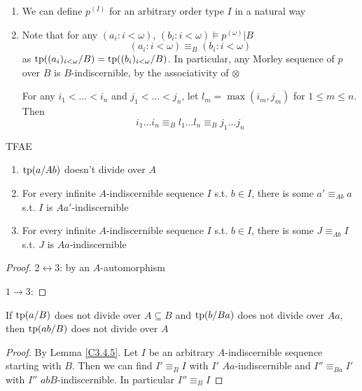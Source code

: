 \documentclass[11pt]{article}
\begin{document}
\begin{remark}
\begin{enumerate}
\item We can define \(p^{(I)}\) for an arbitrary order type \(I\) in a natural way
\item Note that for any \((a_i:i<\omega)\), \((b_i:i<\omega)\vDash p^{(\omega)}|B\)
\begin{equation*}
(a_i:i<\omega)\equiv_B(b_i:i<\omega)
\end{equation*}
as \(\operatorname{tp}((a_i)_{i<\omega}/B)=\operatorname{tp}((b_i)_{i<\omega}/B)\). In particular, any Morley sequence of \(p\)
over \(B\) is \(B\)-indiscernible, by the associativity of \(\otimes\)

For any \(i_1<\dots<i_n\) and \(j_1<\dots<j_n\), let \(l_m=\max(i_m,j_m)\) for \(1\le m\le n\). Then
\begin{equation*}
i_1\dots i_n\equiv_Bl_1\dots l_n\equiv_B j_1\dots j_n
\end{equation*}
\end{enumerate}
\end{remark}

\begin{lemma}[]
\label{C3.4.5}
TFAE
\begin{enumerate}
\item \(\operatorname{tp}(a/Ab)\) doesn't divide over \(A\)
\item For every infinite \(A\)-indiscernible sequence \(I\) s.t. \(b\in I\), there is
some \(a'\equiv_{Ab}a\) s.t. \(I\) is \(Aa'\)-indiscernible
\item For every infinite \(A\)-indiscernible sequence \(I\) s.t. \(b\in I\), there is
some \(J\equiv_{Ab}I\) s.t. \(J\) is \(Aa\)-indiscernible
\end{enumerate}
\end{lemma}

\begin{proof}
\(2\leftrightarrow 3\): by an \(A\)-automorphism

\(1\to 3\):
\end{proof}

\begin{corollary}[]
\label{C3.4.6}
If \(\operatorname{tp}(a/B)\) does not divide over \(A\subseteq B\) and \(\operatorname{tp}(b/Ba)\) does not divide over \(Aa\),
then \(\operatorname{tp}(ab/B)\) does not divide over \(A\)
\end{corollary}

\begin{proof}
By Lemma \ref{C3.4.5}. Let \(I\) be an arbitrary \(A\)-indiscernible sequence starting with \(B\).
Then we can find \(I'\equiv_BI\) with \(I'\) \(Aa\)-indiscernible and \(I''\equiv_{Ba}I'\)
with \(I''\) \(abB\)-indiscernible. In particular \(I''\equiv_BI\)
\end{proof}
\end{document}

